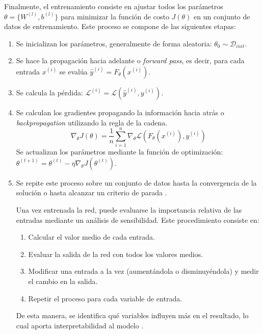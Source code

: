 Finalmente, el entrenamiento consiste en ajustar todos los parámetros $\theta = \{ W^{(l)}, b^{(l)}\}$ para minimizar la función de costo $J(\theta)$ en un conjunto de datos de entrenamiento. Este proceso se compone de las siguientes etapas:

\begin{enumerate}
	
	\item Se inicializan los parámetros, generalmente de forma aleatoria: $\theta_0 \sim \mathcal{D}_{init}$.

	\item Se hace la propagación hacia adelante o \textit{forward pass}, es decir, para cada entrada $x^{(i)}$ se evalúa $\hat{y}^{(i)} = F_\theta(x^{(i)})$. 

	\item Se calcula la pérdida: $\mathcal{L}^{(i)} = \mathcal{L}(\hat{y}^{(i)}, y^{(i)})$.
	
	\item Se calculan los gradientes propagando la información hacia atrás o \textit{backpropagation} utilizando la regla de la cadena.	
	\[
	\nabla_\theta J(\theta) = \frac{1}{n} \sum_{i = 1}^{n} \nabla_\theta \mathcal{L} (F_\theta(x^{(i)}), y^{(i)})
	\]
	Se actualizan los parámetros mediante la función de optimización: $\theta^{(t + 1)} = \theta^{(t)} - \eta \nabla_\theta J(\theta^{(t)})$.

	\item Se repite este proceso sobre un conjunto de datos hasta la convergencia de la solución o hasta alcanzar un criterio de parada \cite{matich2001_ann}.
	
	Una vez entrenada la red, puede evaluarse la importancia relativa de las entradas mediante un análisis de sensibilidad. Este procedimiento consiste en:
	
	\begin{enumerate}
		\item Calcular el valor medio de cada entrada.
		\item Evaluar la salida de la red con todos los valores medios.
		\item Modificar una entrada a la vez (aumentándola o disminuyéndola) y medir el cambio en la salida.
		\item Repetir el proceso para cada variable de entrada.
	\end{enumerate}
	
	De esta manera, se identifica qué variables influyen más en el resultado, lo cual aporta interpretabilidad al modelo \cite{matich2001_ann}.
	
\end{enumerate}

